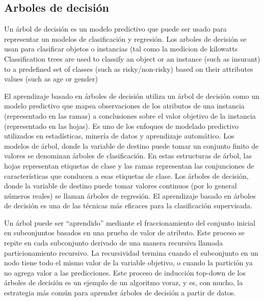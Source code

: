 \subsection{Arboles de decisión}
Un árbol de decisión es un modelo predictivo que puede ser usado para representar un modelos de clasificación y regresión. 
Los arboles de decisión se usan para clasificar objetos o instancias (tal como la medicion de kilowatts 
Classification trees are used to classify an object or an instance (such as insurant) to a
predefined set of classes (such as risky/non-risky) based on their attributes values (such as age or gender)

El aprendizaje basado en árboles de decisión utiliza un árbol de decisión como un modelo predictivo que mapea observaciones de los atributos de una instancia (representado en las ramas) a conclusiones sobre el valor objetivo de la instancia (representado en las hojas).
Es uno de los enfoques de modelado predictivo utilizados en estadísticas, minería de datos y aprendizaje automático. 
Los modelos de árbol, donde la variable de destino puede tomar un conjunto finito de valores se denominan árboles de clasificación. 
En estas estructuras de árbol, las hojas representan etiquetas de clase y las ramas representan las conjunciones de características que conducen a esas etiquetas de clase. 
Los árboles de decisión, donde la variable de destino puede tomar valores continuos (por lo general números reales) se llaman árboles de regresión. El aprendizaje basado en árboles de decisión es una de las técnicas más eficaces para la clasificación supervisada.

Un árbol puede ser ``aprendido'' mediante el fraccionamiento del conjunto inicial en subconjuntos basados en una prueba de valor de atributo. 
Este proceso se repite en cada subconjunto derivado de una manera recursiva llamada particionamiento recursivo. 
La recursividad termina cuando el subconjunto en un nodo tiene todo el mismo valor de la variable objetivo, o cuando la partición ya no agrega valor a las predicciones. 
Este proceso de inducción top-down de los árboles de decisión \cite{InductionofDecisionTrees1986}
es un ejemplo de un algoritmo voraz, y es, con mucho, la estrategia más común para aprender árboles de decisión a partir de datos.

